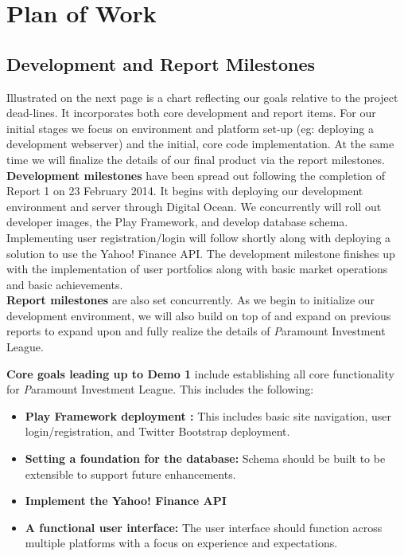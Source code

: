 \chapter{Plan of Work}

\section{Development and Report Milestones}

Illustrated on the next page is a chart reflecting our goals relative to the
project dead-lines. It incorporates both core development and report items. For
our initial stages we focus on environment and platform set-up (eg: deploying a
development webserver) and the initial, core code implementation. At the same time
we will finalize the details of our final product via the report milestones.\\

{\bfseries Development milestones} have been spread out following the completion
of Report 1 on 23 February 2014.  It begins with deploying our development
environment and server through Digital Ocean.  We concurrently will roll out developer
images, the Play Framework, and develop database schema. Implementing user
registration/login will follow shortly along with deploying a solution to use the
Yahoo! Finance API. The development milestone finishes up with the implementation of
user portfolios along with basic market operations and basic achievements.\\

{\bfseries Report milestones} are also set concurrently. As we begin to initialize
our development environment, we will also build on top of and expand on previous
reports to expand upon and fully realize the details of
{\textit Paramount Investment League}.

{\bfseries Core goals leading up to Demo 1} include establishing all core
functionality for {\textit Paramount Investment League}. This includes the following:
\begin{itemize}
\item {\bfseries Play Framework deployment :} This includes basic site navigation,
user login/registration, and Twitter Bootstrap deployment.
\item {\bfseries Setting a foundation for the database: } Schema should be built
to be extensible to support future enhancements.
\item {\bfseries Implement the Yahoo! Finance API}
\item {\bfseries A functional user interface:} The user interface should function
across multiple platforms with a focus on experience and expectations. \\
\end{itemize}

